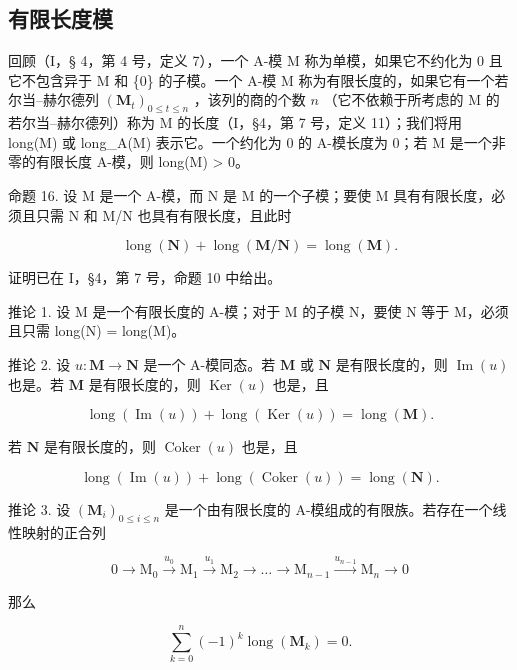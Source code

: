\subsection{有限长度模}

回顾（I，§ 4，第 4 号，定义 7），一个 A-模 M 称为单模，如果它不约化为 0 且它不包含异于 M 和 \{0\} 的子模。一个 A-模 M 称为有限长度的，如果它有一个若尔当–赫尔德列 \((\mathbf{M}_t)_{0 \leqslant t \leqslant n}\) ，该列的商的个数 \(n\) （它不依赖于所考虑的 M 的若尔当–赫尔德列）称为 M 的长度（I，§4，第 7 号，定义 11）；我们将用 long(M) 或 long\_A(M) 表示它。一个约化为 0 的 A-模长度为 0；若 M 是一个非零的有限长度 A-模，则 long(M) \textgreater{} 0。

命题 16. 设 M 是一个 A-模，而 N 是 M 的一个子模；要使 M 具有有限长度，必须且只需 N 和 M/N 也具有有限长度，且此时

\[
\operatorname{long} (\mathbf {N}) + \operatorname{long} (\mathbf {M} / \mathbf {N}) = \operatorname{long} (\mathbf {M}).\tag{34}
\]

证明已在 I，§4，第 7 号，命题 10 中给出。

推论 1. 设 M 是一个有限长度的 A-模；对于 M 的子模 N，要使 N 等于 M，必须且只需 long(N) = long(M)。

推论 2. 设 \(u: \mathbf{M} \to \mathbf{N}\) 是一个 A-模同态。若 \(\mathbf{M}\) 或 \(\mathbf{N}\) 是有限长度的，则 \(\operatorname{Im}(u)\) 也是。若 \(\mathbf{M}\) 是有限长度的，则 \(\operatorname{Ker}(u)\) 也是，且

\[
\operatorname{long} (\operatorname{Im} (u)) + \operatorname{long} (\operatorname{Ker} (u)) = \operatorname{long} (\mathbf {M}).\tag{35}
\]

若 \(\mathbf{N}\) 是有限长度的，则 \(\operatorname{Coker}(u)\) 也是，且

\[
\operatorname{long} (\operatorname{Im} (u)) + \operatorname{long} (\operatorname{Coker} (u)) = \operatorname{long} (\mathbf {N}).\tag{36}
\]

推论 3. 设 \((\mathbf{M}_i)_{0\leqslant i\leqslant n}\) 是一个由有限长度的 A-模组成的有限族。若存在一个线性映射的正合列

\[
0 \longrightarrow \mathrm{M} _ {0} \stackrel {u _ {0}} {\longrightarrow} \mathrm{M} _ {1} \stackrel {u _ {1}} {\longrightarrow} \mathrm{M} _ {2} \longrightarrow \dots \longrightarrow \mathrm{M} _ {n - 1} \stackrel {u _ {n - 1}} {\longrightarrow} \mathrm{M} _ {n} \longrightarrow 0\tag{37}
\]

那么

\[
\sum_ {k = 0} ^ {n} (- 1) ^ {k} \operatorname{long} (\mathbf {M} _ {k}) = 0.\tag{38}
\]

